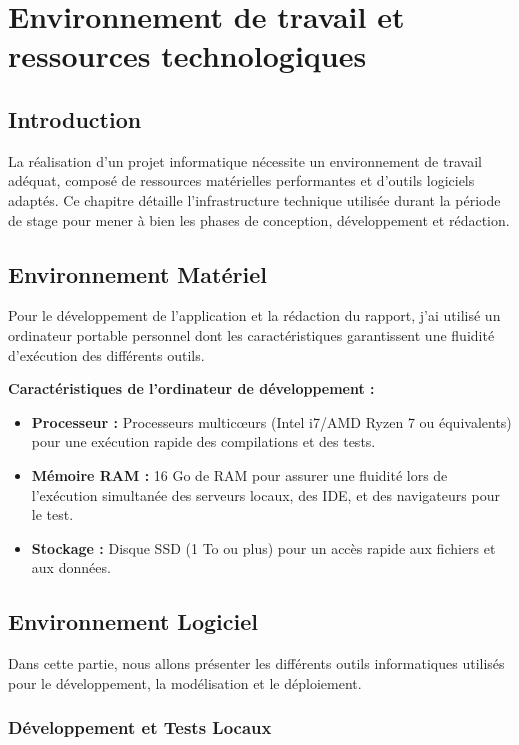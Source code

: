 \chapter{Environnement de travail et ressources technologiques}

\section*{Introduction}
La réalisation d'un projet informatique nécessite un environnement de travail adéquat, composé de ressources matérielles performantes et d'outils logiciels adaptés. Ce chapitre détaille l'infrastructure technique utilisée durant la période de stage pour mener à bien les phases de conception, développement et rédaction.

\section{Environnement Matériel}
Pour le développement de l'application et la rédaction du rapport, j'ai utilisé un ordinateur portable personnel dont les caractéristiques garantissent une fluidité d'exécution des différents outils.

\textbf{Caractéristiques de l'ordinateur de développement :}
\begin{itemize}
    \item \textbf{Processeur :} Processeurs multicœurs (Intel i7/AMD Ryzen 7 ou équivalents) pour une exécution rapide des compilations et des tests.
    \item \textbf{Mémoire RAM :} 16 Go de RAM pour assurer une fluidité lors de l'exécution simultanée des serveurs locaux, des IDE, et des navigateurs pour le test.
    \item \textbf{Stockage :} Disque SSD (1 To ou plus) pour un accès rapide aux fichiers et aux données.
\end{itemize}

\section{Environnement Logiciel}
Dans cette partie, nous allons présenter les différents outils informatiques utilisés pour le développement, la modélisation et le déploiement.

\subsection{Développement et Tests Locaux}

